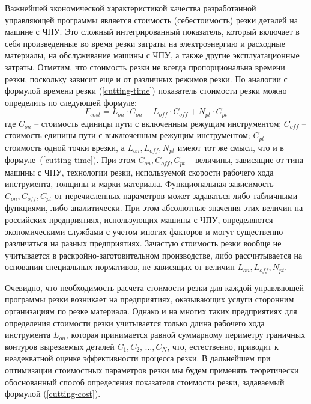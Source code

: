 \documentclass[11pt,twoside,openany]{report}
\begin{document}
Важнейшей экономической характеристикой качества
разработанной управляющей программы является стоимость
(себестоимость) резки деталей на машине с ЧПУ.
Это сложный интегрированный показатель,
который включает в себя произведенные во время
резки затраты на электроэнергию и расходные материалы,
на обслуживание машины с ЧПУ,
а также другие эксплуатационные затраты.
Отметим, что стоимость резки не всегда
пропорциональна времени резки,
поскольку зависит еще и от различных режимов резки.
По аналогии с формулой времени резки (\ref{cutting-time})
показатель стоимости резки можно определить по следующей формуле:
\begin{equation}
  F_{cost}=
  L_{on} \cdot C_{on} +
  L_{off} \cdot C_{off} +
  N_{pt} \cdot C_{pt}
  \label{cutting-cost}
\end{equation}
где
$C_{on}$ -- стоимость единицы пути с включенным режущим инструментом;
$C_{off}$ -- стоимость единицы пути с выключенным режущим инструментом;
$C_{pt}$ -- стоимость одной точки врезки,
а $L_{on}, L_{off}, N_{pt}$
имеют тот же смысл, что и в формуле~(\ref{cutting-time}).
При этом $C_{on}, C_{off}, C_{pt}$ --
величины, зависящие от типа машины с ЧПУ,
технологии резки, используемой скорости рабочего хода инструмента,
толщины и марки материала.
Функциональная зависимость
$C_{on}, C_{off}, C_{pt}$
от перечисленных параметров
может задаваться либо табличными функциями,
либо аналитически.
При этом абсолютные значения этих величин
на российских предприятиях, использующих машины с ЧПУ,
определяются экономическими службами с учетом многих факторов
и могут существенно различаться на разных предприятиях.
Зачастую стоимость резки вообще не учитывается
в раскройно-заготовительном производстве,
либо рассчитывается на основании специальных нормативов,
не зависящих от величин
$L_{on}, L_{off}, N_{pt}$.

Очевидно, что необходимость расчета стоимости резки
для каждой управляющей программы резки возникает на предприятиях,
оказывающих услуги сторонним организациям по резке материала.
Однако и на многих таких предприятиях для определения
стоимости резки учитывается только длина рабочего хода инструмента
$L_{on}$,
которая принимается равной суммарному периметру граничных контуров вырезаемых деталей
$C_1, C_2, \,\dots, C_N$,
что, естественно, приводит к неадекватной оценке эффективности процесса резки.
В дальнейшем при оптимизации стоимостных параметров резки
мы будем применять теоретически обоснованный способ определения
показателя стоимости резки, задаваемый формулой (\ref{cutting-cost}).
\end{document}
